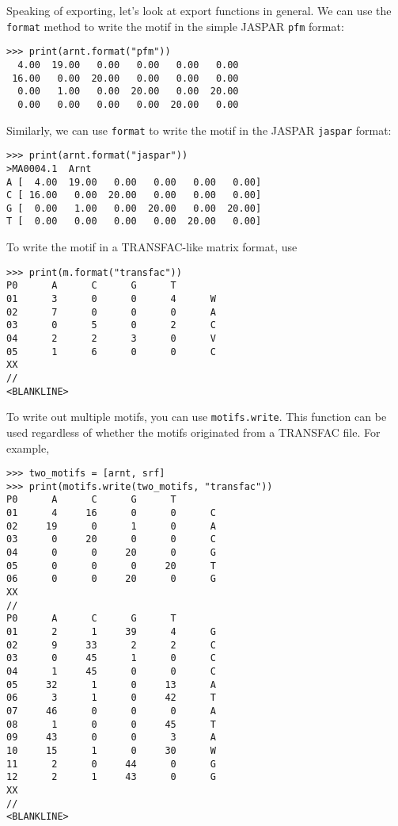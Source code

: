 Speaking of exporting, let's look at export functions in general.
We can use the \verb+format+ method to write the motif in the simple JASPAR \verb+pfm+ format:
\begin{verbatim}
>>> print(arnt.format("pfm"))
  4.00  19.00   0.00   0.00   0.00   0.00
 16.00   0.00  20.00   0.00   0.00   0.00
  0.00   1.00   0.00  20.00   0.00  20.00
  0.00   0.00   0.00   0.00  20.00   0.00
\end{verbatim}
Similarly, we can use \verb+format+ to write the motif in the JASPAR \verb+jaspar+ format:
\begin{verbatim}
>>> print(arnt.format("jaspar"))
>MA0004.1  Arnt
A [  4.00  19.00   0.00   0.00   0.00   0.00]
C [ 16.00   0.00  20.00   0.00   0.00   0.00]
G [  0.00   1.00   0.00  20.00   0.00  20.00]
T [  0.00   0.00   0.00   0.00  20.00   0.00]
\end{verbatim}

To write the motif in a TRANSFAC-like matrix format, use
\begin{verbatim}
>>> print(m.format("transfac"))
P0      A      C      G      T
01      3      0      0      4      W
02      7      0      0      0      A
03      0      5      0      2      C
04      2      2      3      0      V
05      1      6      0      0      C
XX
//
<BLANKLINE>
\end{verbatim}

To write out multiple motifs, you can use \verb+motifs.write+.
This function can be used regardless of whether the motifs originated from a TRANSFAC file. For example,
\begin{verbatim}
>>> two_motifs = [arnt, srf]
>>> print(motifs.write(two_motifs, "transfac"))
P0      A      C      G      T
01      4     16      0      0      C
02     19      0      1      0      A
03      0     20      0      0      C
04      0      0     20      0      G
05      0      0      0     20      T
06      0      0     20      0      G
XX
//
P0      A      C      G      T
01      2      1     39      4      G
02      9     33      2      2      C
03      0     45      1      0      C
04      1     45      0      0      C
05     32      1      0     13      A
06      3      1      0     42      T
07     46      0      0      0      A
08      1      0      0     45      T
09     43      0      0      3      A
10     15      1      0     30      W
11      2      0     44      0      G
12      2      1     43      0      G
XX
//
<BLANKLINE>
\end{verbatim}

